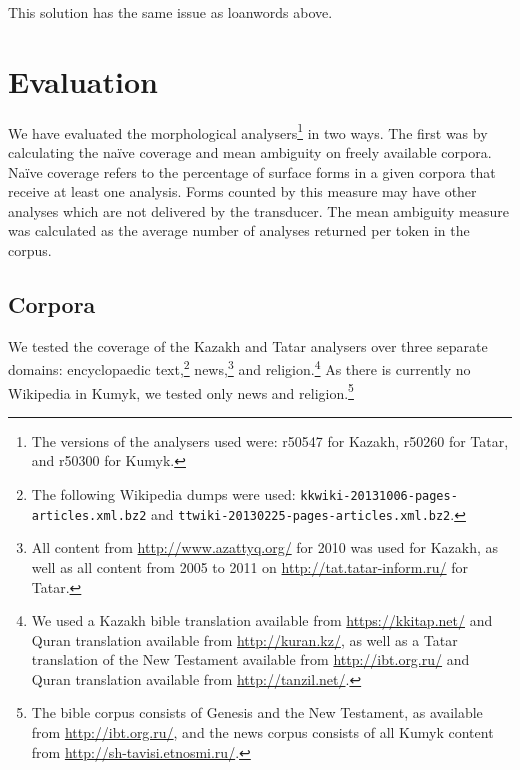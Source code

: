 \documentclass[a4paper,11pt,twocolumn]{article}
\begin{document}

This solution has the same issue as loanwords above.


\section{Evaluation}\label{sec:evaluation}

We have evaluated the morphological analysers\footnote{The versions of the analysers used were: r50547 for Kazakh, r50260 for Tatar, and r50300 for Kumyk.} in two ways. The first was by calculating the naïve coverage and mean ambiguity on freely available corpora. Naïve coverage refers to the percentage of surface forms in a given corpora that receive at least one analysis.  Forms counted by this measure may have other analyses which are not delivered by the transducer. The mean ambiguity measure was calculated as the average number of analyses returned per token in the corpus.


\subsection{Corpora}

We tested the coverage of the Kazakh and Tatar analysers over three separate domains: encyclopaedic text,\footnote{The following Wikipedia dumps were used: \texttt{kkwiki-20131006-pages-articles.xml.bz2} and \texttt{ttwiki-20130225-pages-articles.xml.bz2}.}
 news,\footnote{All content from \url{http://www.azattyq.org/} for 2010 was used for Kazakh, as well as all content from 2005 to 2011 on \url{http://tat.tatar-inform.ru/} for Tatar.} and religion.\footnote{We used a Kazakh bible translation available from \url{https://kkitap.net/} and Quran translation available from \url{http://kuran.kz/}, as well as a Tatar translation of the New Testament available from \url{http://ibt.org.ru/} and Quran translation available from \url{http://tanzil.net/}.}  As there is currently no Wikipedia in Kumyk, we tested only news and religion.\footnote{The bible corpus consists of Genesis and the New Testament, as available from \url{http://ibt.org.ru/}, and the news corpus consists of all Kumyk content from \url{http://sh-tavisi.etnosmi.ru/}.}
\end{document}
